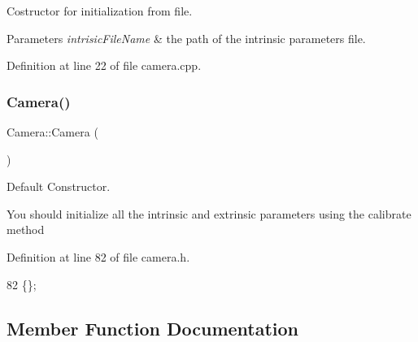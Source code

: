 Costructor for initialization from file. 


\begin{DoxyParams}{Parameters}
{\em intrisic\+File\+Name} & the path of the intrinsic parameters file. \\
\hline
\end{DoxyParams}


Definition at line 22 of file camera.\+cpp.


\mbox{\label{classCamera_a01f94c3543f56ede7af49dc778f19331}} 
\subsubsection{\texorpdfstring{Camera()}{Camera()}\hspace{0.1cm}{\footnotesize\ttfamily [2/2]}}
{\footnotesize\ttfamily Camera\+::\+Camera (\begin{DoxyParamCaption}{ }\end{DoxyParamCaption})\hspace{0.3cm}{\ttfamily [inline]}}



Default Constructor. 

You should initialize all the intrinsic and extrinsic parameters using the calibrate method 

Definition at line 82 of file camera.\+h.


\begin{DoxyCode}
82 \{\};
\end{DoxyCode}


\subsection{Member Function Documentation}
\mbox{\label{classCamera_a2498b18efe884472517a430db83d9c74}} 
